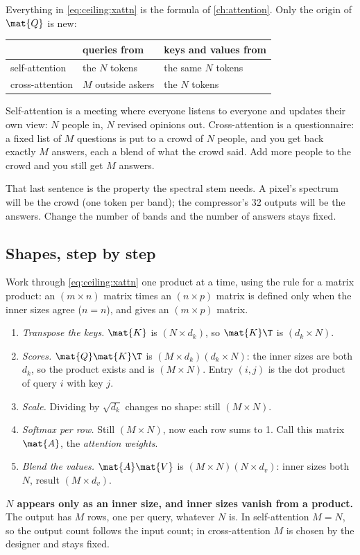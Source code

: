 Everything in \cref{eq:ceiling:xattn} is the formula of \cref{ch:attention}. Only the origin of $\mat{Q}$ is new:
\begin{center}
\begin{tabular}{lll}\toprule
 & queries from & keys and values from\\\midrule
self-attention & the $N$ tokens & the same $N$ tokens\\
cross-attention & $M$ outside askers & the $N$ tokens\\\bottomrule
\end{tabular}
\end{center}

\begin{analogy}
Self-attention is a meeting where everyone listens to everyone and updates their own view: $N$ people in, $N$ revised opinions out. Cross-attention is a questionnaire: a fixed list of $M$ questions is put to a crowd of $N$ people, and you get back exactly $M$ answers, each a blend of what the crowd said. Add more people to the crowd and you still get $M$ answers.
\end{analogy}

That last sentence is the property the spectral stem needs. A pixel's spectrum will be the crowd (one token per band); the compressor's 32 outputs will be the answers. Change the number of bands and the number of answers stays fixed.

\subsection{Shapes, step by step}

Work through \cref{eq:ceiling:xattn} one product at a time, using the rule for a matrix product: an $(m\times n)$ matrix times an $(n\times p)$ matrix is defined only when the inner sizes agree ($n = n$), and gives an $(m\times p)$ matrix.

\begin{enumerate}
\item \emph{Transpose the keys.} $\mat{K}$ is $(N\times d_k)$, so $\mat{K}\T$ is $(d_k\times N)$.
\item \emph{Scores.} $\mat{Q}\mat{K}\T$ is $(M\times d_k)(d_k\times N)$: the inner sizes are both $d_k$, so the product exists and is $(M\times N)$. Entry $(i, j)$ is the dot product of query $i$ with key $j$.
\item \emph{Scale.} Dividing by $\sqrt{d_k}$ changes no shape: still $(M\times N)$.
\item \emph{Softmax per row.} Still $(M\times N)$, now each row sums to 1. Call this matrix $\mat{A}$, the \emph{attention weights}.
\item \emph{Blend the values.} $\mat{A}\mat{V}$ is $(M\times N)(N\times d_v)$: inner sizes both $N$, result $(M\times d_v)$.
\end{enumerate}
\textbf{$N$ appears only as an inner size, and inner sizes vanish from a product.} The output has $M$ rows, one per query, whatever $N$ is. In self-attention $M = N$, so the output count follows the input count; in cross-attention $M$ is chosen by the designer and stays fixed.

